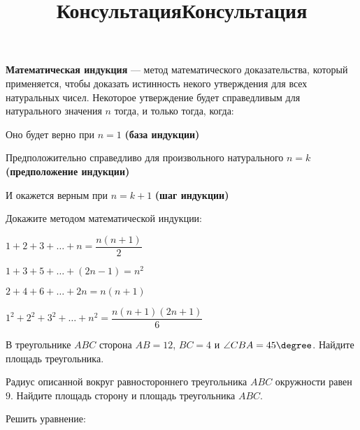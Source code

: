 %
%
\newpage
\title{Консультация}
\textbf{Математическая индукция} --- метод математического доказательства, который применяется, чтобы доказать истинность некого утверждения для всех натуральных чисел. Некоторое утверждение будет справедливым для натурального значения \( n \) тогда, и только тогда, когда:
\begin{enumcols}[itemcolumns=1]
	\item Оно будет верно при \( n=1 \) \textbf{(база индукции)}
	\item Предположительно справедливо для произвольного натурального \( n=k \) \textbf{(предположение индукции)}
	\item И окажется верным при \( n=k+1 \) \textbf{(шаг индукции)}
\end{enumcols}
\begin{listofex}
	\item Докажите методом математической индукции:
	\begin{enumcols}[itemcolumns=2]
		\item \( 1+2+3+\dots+n=\dfrac{n(n+1)}{2} \)
		\item \( 1+3+5+\dots+(2n-1)=n^2 \)
		\item \( 2+4+6+\dots+2n=n(n+1) \)
		\item \( 1^2+2^2+3^2+\dots+n^2=\dfrac{n(n+1)(2n+1)}{6} \)
	\end{enumcols}
	\item В треугольнике \( ABC \) сторона \( AB=12 \), \( BC=4 \) и \( \angle CBA=45\degree \). Найдите площадь треугольника.
	\item Радиус описанной вокруг равностороннего треугольника \( ABC \) окружности равен \( 9 \). Найдите площадь сторону и площадь треугольника \( ABC \).
\end{listofex}
\newpage
\title{Консультация}
\begin{listofex}
	\item Решить уравнение:
	\begin{enumcols}[itemcolumns=1]
		\item {}
		\item {}
		\item {}
		\item {}
		\item {}
		\item {}
		\item {}
	\end{enumcols}
\end{listofex}
